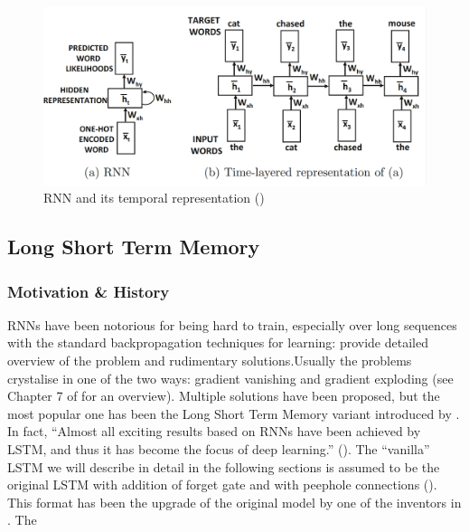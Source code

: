 \begin{figure}[!b]
    \begin{center}
        \includegraphics[scale=0.4]{Images/rnn-diagram-temporal.png}
        \caption{RNN and its temporal representation (\cite{aggarwalNeuralNetworksDeep2018})}
        \label{fig:rnn-diagram-temporal}
    \end{center}
\end{figure}

\subsection*{Long Short Term Memory}
\subsubsection*{Motivation \& History}
RNNs have been notorious for being hard to train, especially over long sequences with the standard backpropagation techniques for learning: \cite{bengioLearningLongtermDependencies1994} provide detailed overview of the problem and rudimentary solutions.Usually the problems crystalise in one of the two ways: gradient vanishing and gradient exploding (see Chapter 7 of \cite{aggarwalNeuralNetworksDeep2018} for an overview). Multiple solutions have been proposed, but the most popular one has been the Long Short Term Memory variant introduced by \cite{hochreiterLongShortTermMemory1997}. In fact, ``Almost all exciting results based on RNNs have been achieved by LSTM, and thus it has become the focus of deep learning.'' (\cite{yuReviewRecurrentNeural2019}). The ``vanilla'' LSTM we will describe in detail in the following sections is assumed to be the original LSTM with addition of forget gate and with peephole connections (\cite{vanhoudtReviewLongShortTerm2020}). This format has been the upgrade of the original model by one of the inventors in \cite{gersLearningForgetContinual2000}. The 

